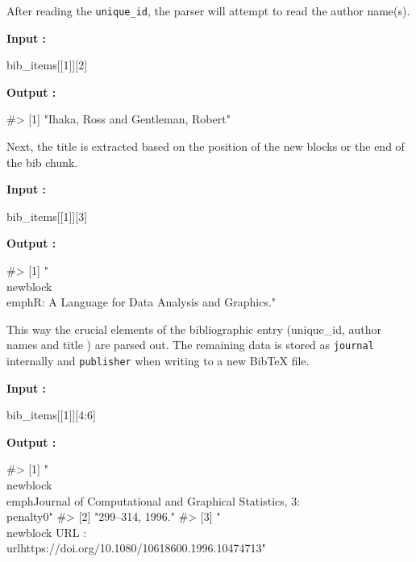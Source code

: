 After reading the \verb|unique_id|, the parser will attempt to read the author name(s).

\begin{Schunk}
 
\textbf{Input :}
\begin{Sinput}
bib_items[[1]][2]
\end{Sinput}
 
\textbf{Output :}
\begin{Soutput}
#> [1] "Ihaka, Ross and Gentleman, Robert"
\end{Soutput}
\end{Schunk}

Next, the title is extracted based on the position of the new blocks or the end of the bib chunk. 

\begin{Schunk}
 
\textbf{Input :}
\begin{Sinput}
bib_items[[1]][3]
\end{Sinput}
\textbf{Output :}
\begin{Soutput}
#> [1] "\\newblock \\emph{R: A Language for Data Analysis and Graphics.}"
\end{Soutput}
\end{Schunk}

This way the crucial elements of the bibliographic entry (unique_id, author names and title ) are parsed out.
The remaining data is stored as \verb|journal| internally and \verb|publisher| when writing to a new BibTeX file.

\begin{Schunk}
 
\textbf{Input :}
\begin{Sinput}
bib_items[[1]][4:6]
\end{Sinput}
 
\textbf{Output :}
\begin{Soutput}
#> [1] "\\newblock \\emph{Journal of Computational and Graphical Statistics}, 3:\\penalty0"
#> [2] "299--314, 1996."                                                                   
#> [3] "\\newblock URL : \\url{https://doi.org/10.1080/10618600.1996.10474713}"
\end{Soutput}
\end{Schunk}


